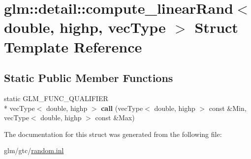 \hypertarget{structglm_1_1detail_1_1compute__linearRand_3_01double_00_01highp_00_01vecType_01_4}{\section{glm\-:\-:detail\-:\-:compute\-\_\-linear\-Rand$<$ double, highp, vec\-Type $>$ Struct Template Reference}
\label{structglm_1_1detail_1_1compute__linearRand_3_01double_00_01highp_00_01vecType_01_4}
}
\subsection*{Static Public Member Functions}
\begin{DoxyCompactItemize}
\item 
\hypertarget{structglm_1_1detail_1_1compute__linearRand_3_01double_00_01highp_00_01vecType_01_4_a2b6945aa0c510d768365896126a5017a}{static G\-L\-M\-\_\-\-F\-U\-N\-C\-\_\-\-Q\-U\-A\-L\-I\-F\-I\-E\-R \\*
vec\-Type$<$ double, highp $>$ {\bfseries call} (vec\-Type$<$ double, highp $>$ const \&Min, vec\-Type$<$ double, highp $>$ const \&Max)}\label{structglm_1_1detail_1_1compute__linearRand_3_01double_00_01highp_00_01vecType_01_4_a2b6945aa0c510d768365896126a5017a}

\end{DoxyCompactItemize}


The documentation for this struct was generated from the following file\-:\begin{DoxyCompactItemize}
\item 
glm/gtc/\hyperlink{random_8inl}{random.\-inl}\end{DoxyCompactItemize}
